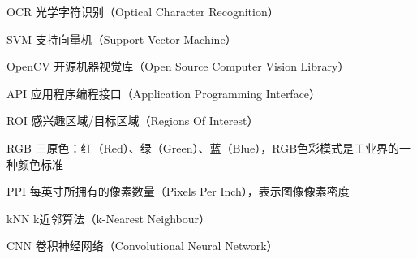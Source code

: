 ﻿\begin{denotation}
  \item[OCR] 光学字符识别（Optical Character Recognition）
  \item[SVM] 支持向量机（Support Vector Machine）
  \item[OpenCV] 开源机器视觉库（Open Source Computer Vision Library）
  \item[API] 应用程序编程接口（Application Programming Interface）
  \item[ROI] 感兴趣区域/目标区域（Regions Of Interest）
  \item[RGB] 三原色：红（Red）、绿（Green）、蓝（Blue），RGB色彩模式是工业界的一种颜色标准
  \item[PPI] 每英寸所拥有的像素数量（Pixels Per Inch），表示图像像素密度
  \item[kNN] k近邻算法（k-Nearest Neighbour）
  \item[CNN] 卷积神经网络（Convolutional Neural Network）
\end{denotation}
